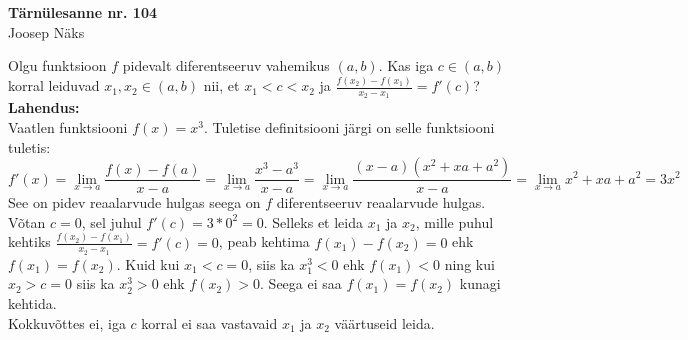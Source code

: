 \documentclass{article}
\begin{document}
\begin{center}
\Large\textbf{T\"arn\"ulesanne nr. 104}\\
\small{Joosep N\"aks}
\end{center}
Olgu funktsioon $f$ pidevalt diferentseeruv vahemikus $(a,b)$. Kas iga $c\in(a,b)$ korral leiduvad $x_1,x_2\in(a,b)$ nii, et $x_1<c<x_2$ ja $\displaystyle\frac{f(x_2)-f(x_1)}{x_2-x_1}=f'(c)$?\\
\textbf{Lahendus:}\\
Vaatlen funktsiooni $f(x)=x^3$. Tuletise definitsiooni j\"argi on selle funktsiooni tuletis:
\begin{equation*}
f'(x)=\lim_{x\to a}\frac{f(x)-f(a)}{x-a}=\lim_{x\to a}\frac{x^3-a^3}{x-a}=\lim_{x\to a}\frac{(x-a)(x^2+xa+a^2)}{x-a}=\lim_{x\to a}x^2+xa+a^2=3x^2
\end{equation*}
See on pidev reaalarvude hulgas seega on $f$ diferentseeruv reaalarvude hulgas. V\~otan $c=0$, sel juhul $f'(c)=3*0^2=0$. Selleks et leida $x_1$ ja $x_2$, mille puhul kehtiks $\displaystyle\frac{f(x_2)-f(x_1)}{x_2-x_1}=f'(c)=0$, peab kehtima $f(x_1)-f(x_2)=0$ ehk $f(x_1)=f(x_2)$. Kuid kui $x_1<c=0$, siis ka $x_1^3<0$ ehk $f(x_1)<0$ ning kui $x_2>c=0$ siis ka $x_2^3>0$ ehk $f(x_2)>0$. Seega ei saa $f(x_1)=f(x_2)$ kunagi kehtida.\\
Kokkuv\~ottes ei, iga $c$ korral ei saa vastavaid $x_1$ ja $x_2$ v\"a\"artuseid leida.
\end{document}
